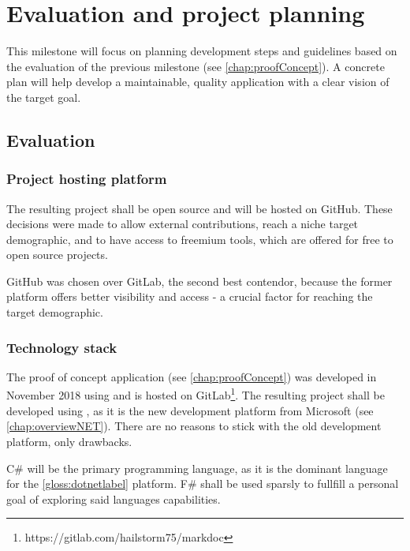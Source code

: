 \chapter{Evaluation and project planning} \label{chap:evalProjPlan}

This milestone will focus on planning development steps and guidelines based on the evaluation of the previous milestone (see \ref{chap:proofConcept}).
A concrete plan will help develop a maintainable, quality application with a clear vision of the target goal.

\section{Evaluation}

\subsection{Project hosting platform}

The resulting project shall be open source and will be hosted on GitHub.
These decisions were made to allow external contributions, reach a niche target demographic, and to have access to freemium tools, which are offered for free to open source projects.

GitHub was chosen over GitLab, the second best contendor, because the former platform offers better visibility and access - a crucial factor for reaching the target demographic.

\subsection{Technology stack}

The proof of concept application (see \ref{chap:proofConcept}) was developed in November 2018 using  and is hosted on GitLab\footnote{https://gitlab.com/hailstorm75/markdoc}. The resulting project shall be developed using , as it is the new development platform from Microsoft (see \ref{chap:overviewNET}). There are no reasons to stick with the old development platform, only drawbacks.

C\# will be the primary programming language, as it is the dominant language for the \ref{gloss:dotnetlabel} platform.
F\# shall be used sparsly to fullfill a personal goal of exploring said languages capabilities.
